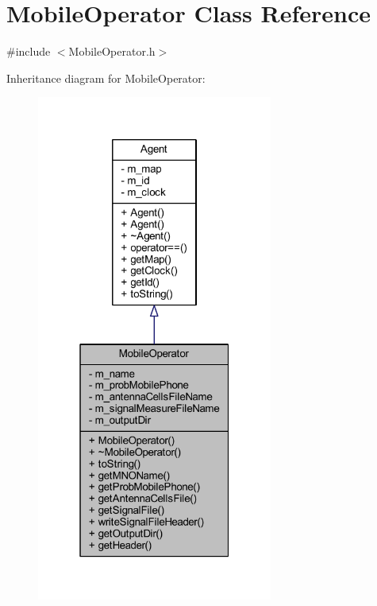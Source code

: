 \hypertarget{class_mobile_operator}{}\section{Mobile\+Operator Class Reference}
\label{class_mobile_operator}


{\ttfamily \#include $<$Mobile\+Operator.\+h$>$}



Inheritance diagram for Mobile\+Operator\+:
\nopagebreak
\begin{figure}[H]
\begin{center}
\leavevmode
\includegraphics[width=220pt]{class_mobile_operator__inherit__graph}
\end{center}
\end{figure}


